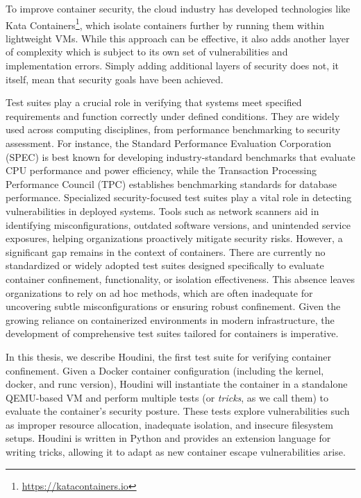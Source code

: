 \documentclass[12pt]{report}
\begin{document}
\begin{doublespace}
To improve container security, the cloud industry has developed technologies like Kata Containers\footnote{\url{https://katacontainers.io}}, which isolate containers further by running them within lightweight VMs. While this approach can be effective, it also adds another layer of complexity which is subject to its own set of vulnerabilities and implementation errors. Simply adding additional layers of security does not, it itself, mean that security goals have been achieved.

Test suites play a crucial role in verifying that systems meet specified requirements and function correctly under defined conditions. They are widely used across computing disciplines, from performance benchmarking to security assessment. For instance, the Standard Performance Evaluation Corporation (SPEC) \cite{henning2000spec} is best known for developing industry-standard benchmarks that evaluate CPU performance and power efficiency, while the Transaction Processing Performance Council (TPC) \cite{10.1007/978-3-642-18206-8_1} establishes benchmarking standards for database performance.
Specialized security-focused test suites play a vital role in detecting vulnerabilities in deployed systems. Tools such as network scanners aid in identifying misconfigurations, outdated software versions, and unintended service exposures, helping organizations proactively mitigate security risks. However, a significant gap remains in the context of containers. There are currently no standardized or widely adopted test suites designed specifically to evaluate container confinement, functionality, or isolation effectiveness. This absence leaves organizations to rely on ad hoc methods, which are often inadequate for uncovering subtle misconfigurations or ensuring robust confinement. Given the growing reliance on containerized environments in modern infrastructure, the development of comprehensive test suites tailored for containers is imperative.

In this thesis, we describe Houdini, the first test suite for verifying container confinement. Given a Docker container configuration (including the kernel, docker, and runc version), Houdini will instantiate the container in a standalone QEMU-based VM and perform multiple tests (or \textit{tricks}, as we call them) to evaluate the container's security posture. These tests explore vulnerabilities such as improper resource allocation, inadequate isolation, and insecure filesystem setups. Houdini is written in Python and provides an extension language for writing tricks, allowing it to adapt as new container escape vulnerabilities arise.


\end{doublespace}
\end{document}

